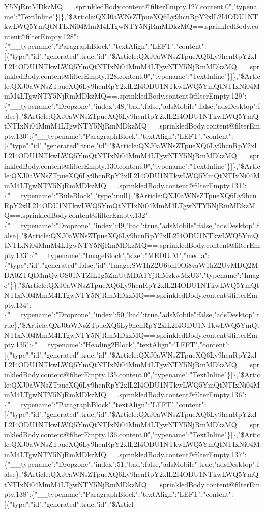 Y5NjRmMDkzMQ==.sprinkledBody.content@filterEmpty.127.content.0","typename":"TextInline"\}{]}\},"\$Article:QXJ0aWNsZTpueXQ6Ly9hcnRpY2xlL2I4ODU1NTkwLWQ5YmQtNTIxNi04MmM4LTgwNTY5NjRmMDkzMQ==.sprinkledBody.content@filterEmpty.128":\{"\_\_typename":"ParagraphBlock","textAlign":"LEFT","content":{[}\{"type":"id","generated":true,"id":"\$Article:QXJ0aWNsZTpueXQ6Ly9hcnRpY2xlL2I4ODU1NTkwLWQ5YmQtNTIxNi04MmM4LTgwNTY5NjRmMDkzMQ==.sprinkledBody.content@filterEmpty.128.content.0","typename":"TextInline"\}{]}\},"\$Article:QXJ0aWNsZTpueXQ6Ly9hcnRpY2xlL2I4ODU1NTkwLWQ5YmQtNTIxNi04MmM4LTgwNTY5NjRmMDkzMQ==.sprinkledBody.content@filterEmpty.129":\{"\_\_typename":"Dropzone","index":48,"bad":false,"adsMobile":false,"adsDesktop":false\},"\$Article:QXJ0aWNsZTpueXQ6Ly9hcnRpY2xlL2I4ODU1NTkwLWQ5YmQtNTIxNi04MmM4LTgwNTY5NjRmMDkzMQ==.sprinkledBody.content@filterEmpty.130":\{"\_\_typename":"ParagraphBlock","textAlign":"LEFT","content":{[}\{"type":"id","generated":true,"id":"\$Article:QXJ0aWNsZTpueXQ6Ly9hcnRpY2xlL2I4ODU1NTkwLWQ5YmQtNTIxNi04MmM4LTgwNTY5NjRmMDkzMQ==.sprinkledBody.content@filterEmpty.130.content.0","typename":"TextInline"\}{]}\},"\$Article:QXJ0aWNsZTpueXQ6Ly9hcnRpY2xlL2I4ODU1NTkwLWQ5YmQtNTIxNi04MmM4LTgwNTY5NjRmMDkzMQ==.sprinkledBody.content@filterEmpty.131":\{"\_\_typename":"RuleBlock","type":null\},"\$Article:QXJ0aWNsZTpueXQ6Ly9hcnRpY2xlL2I4ODU1NTkwLWQ5YmQtNTIxNi04MmM4LTgwNTY5NjRmMDkzMQ==.sprinkledBody.content@filterEmpty.132":\{"\_\_typename":"Dropzone","index":49,"bad":true,"adsMobile":false,"adsDesktop":false\},"\$Article:QXJ0aWNsZTpueXQ6Ly9hcnRpY2xlL2I4ODU1NTkwLWQ5YmQtNTIxNi04MmM4LTgwNTY5NjRmMDkzMQ==.sprinkledBody.content@filterEmpty.133":\{"\_\_typename":"ImageBlock","size":"MEDIUM","media":\{"type":"id","generated":false,"id":"Image:SW1hZ2U6bnl0Oi8vaW1hZ2UvMDQ2MDA0ZTQtMmQwOS01NTZlLTg5ZmUtMDA1YjRlMzkwMzU3","typename":"Image"\}\},"\$Article:QXJ0aWNsZTpueXQ6Ly9hcnRpY2xlL2I4ODU1NTkwLWQ5YmQtNTIxNi04MmM4LTgwNTY5NjRmMDkzMQ==.sprinkledBody.content@filterEmpty.134":\{"\_\_typename":"Dropzone","index":50,"bad":true,"adsMobile":false,"adsDesktop":true\},"\$Article:QXJ0aWNsZTpueXQ6Ly9hcnRpY2xlL2I4ODU1NTkwLWQ5YmQtNTIxNi04MmM4LTgwNTY5NjRmMDkzMQ==.sprinkledBody.content@filterEmpty.135":\{"\_\_typename":"Heading2Block","textAlign":"LEFT","content":{[}\{"type":"id","generated":true,"id":"\$Article:QXJ0aWNsZTpueXQ6Ly9hcnRpY2xlL2I4ODU1NTkwLWQ5YmQtNTIxNi04MmM4LTgwNTY5NjRmMDkzMQ==.sprinkledBody.content@filterEmpty.135.content.0","typename":"TextInline"\}{]}\},"\$Article:QXJ0aWNsZTpueXQ6Ly9hcnRpY2xlL2I4ODU1NTkwLWQ5YmQtNTIxNi04MmM4LTgwNTY5NjRmMDkzMQ==.sprinkledBody.content@filterEmpty.136":\{"\_\_typename":"ParagraphBlock","textAlign":"LEFT","content":{[}\{"type":"id","generated":true,"id":"\$Article:QXJ0aWNsZTpueXQ6Ly9hcnRpY2xlL2I4ODU1NTkwLWQ5YmQtNTIxNi04MmM4LTgwNTY5NjRmMDkzMQ==.sprinkledBody.content@filterEmpty.136.content.0","typename":"TextInline"\}{]}\},"\$Article:QXJ0aWNsZTpueXQ6Ly9hcnRpY2xlL2I4ODU1NTkwLWQ5YmQtNTIxNi04MmM4LTgwNTY5NjRmMDkzMQ==.sprinkledBody.content@filterEmpty.137":\{"\_\_typename":"Dropzone","index":51,"bad":false,"adsMobile":true,"adsDesktop":false\},"\$Article:QXJ0aWNsZTpueXQ6Ly9hcnRpY2xlL2I4ODU1NTkwLWQ5YmQtNTIxNi04MmM4LTgwNTY5NjRmMDkzMQ==.sprinkledBody.content@filterEmpty.138":\{"\_\_typename":"ParagraphBlock","textAlign":"LEFT","content":{[}\{"type":"id","generated":true,"id":"\$Articl